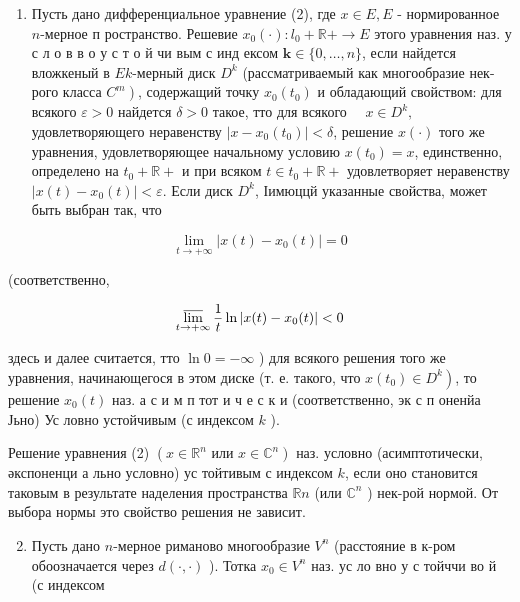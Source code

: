 \documentclass[10pt]{article}
\begin{document}
\begin{enumerate}

  \item Пусть дано дифференциальное уравнение (2), где $x \in E, E$ - нормированное $n$-мерное п ространство. Решевие $x_{0}(\cdot): l_{0}+\mathbb{R}+\longrightarrow E$ этого уравнения наз. у с л о в в о у с т о й чи вым с инд ексом $\boldsymbol{k} \in\{0, \ldots, n\}$, если найдется вложкеный в $E k$-мерный диск $D^{k}$ (рассматриваемый как многообразие нек-рого класса $\left.C^{m}\right)$, содержащий точку $x_{0}\left(t_{0}\right)$ и обладающий свойством: для всякого $\varepsilon>0$ найдется $\delta>0$ такое, тто для всякого $\quad x \in D^{k}, \quad$ удовлетворяющего неравенству $\left|x-x_{0}\left(t_{0}\right)\right|<\delta$, решение $x(\cdot)$ того же уравнения, удовлетворяющее начальному условию $x\left(t_{0}\right)=x$, единственно, определено на $t_{0}+\mathbb{R}+$ и при всяком $t \in t_{0}+\mathbb{R}+$ удовлетворяет неравенству $\left|x(t)-x_{0}(t)\right|<\varepsilon$. Если диск $D^{k}$, Іимюццй указанные свойства, может быть выбран так, что

\end{enumerate}



\[

\lim _{t \rightarrow+\infty}\left|x(t)-x_{0}(t)\right|=0

\]



(соответственно,



\[

\varlimsup_{t \rightarrow+\infty} \frac{1}{t} \ln \left|x(t)-x_{0}(t)\right|<0

\]



здесь и далее считается, тто $\ln 0=-\infty$ ) для всякого решения того же уравнения, начинающегося в этом диске (т. е. такого, что $\left.x\left(t_{0}\right) \in D^{k}\right)$, то решение $x_{0}(t)$ наз. а с и м п тот и ч е с к и (соответственно, эк с п оненйа Јьно) Ус ловно устойчивым (с индексом $k$ ).



Решение уравнения (2) $\left(x \in \mathbb{R}^{n}\right.$ или $\left.x \in \mathbb{C}^{n}\right)$ наз. условно (асимптотически, әкспоненци а льно условно) ус тойтивым с индексом $k$, если оно становится таковым в результате наделения пространства $\mathbb{R} n$ (или $\mathbb{C}^{n}$ ) нек-рой нормой. От выбора нормы это свойство решения не зависит.



\begin{enumerate}

  \setcounter{enumi}{1}

  \item Пусть дано $n$-мерное риманово многообразие $V^{n}$ (расстояние в к-ром обоозначается через $d(\cdot, \cdot)$ ). Тотка $x_{0} \in V^{n}$ наз. ус ло вно у с тойччи во й (с индексом

\end{enumerate}
\end{document}
